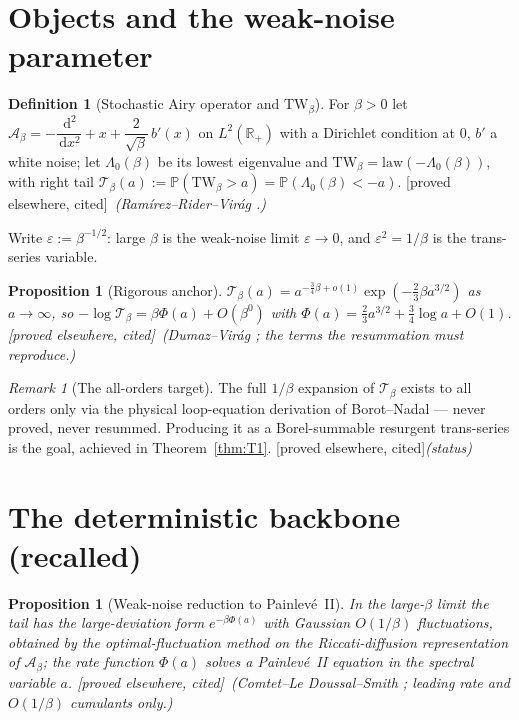 \documentclass[11pt,reqno]{amsart}
\theoremstyle{plain}
\newtheorem{proposition}[theorem]{Proposition}
\theoremstyle{definition}
\newtheorem{definition}[theorem]{Definition}
\theoremstyle{remark}
\newtheorem{remark}[theorem]{Remark}
\newcommand{\dd}{\,\mathrm{d}}
\newcommand{\R}{\mathbb{R}}
\newcommand{\Prob}{\mathbb{P}}
\newcommand{\SAO}{\mathcal{A}_\beta}
\newcommand{\TW}{\mathrm{TW}_\beta}
\newcommand{\eps}{\varepsilon}
\newcommand{\tagP}{{\footnotesize\textsf{[proved elsewhere, cited]}}}
\begin{document}
\maketitle

\section{Objects and the weak-noise parameter}

\begin{definition}[Stochastic Airy operator and $\TW$]\label{def:sao}
For $\beta>0$ let $\SAO=-\dfrac{\dd^2}{\dd x^2}+x+\dfrac{2}{\sqrt\beta}\,b'(x)$ on
$L^2(\R_+)$ with a Dirichlet condition at $0$, $b'$ a white noise; let $\Lambda_0(\beta)$ be its
lowest eigenvalue and $\TW=\mathrm{law}(-\Lambda_0(\beta))$, with right tail
$\mathcal T_\beta(a):=\Prob(\TW>a)=\Prob(\Lambda_0(\beta)<-a)$. \tagP\ \emph{(Ram\'irez--Rider--Vir\'ag
\cite{RRV}.)}
\end{definition}

Write $\eps:=\beta^{-1/2}$: large $\beta$ is the weak-noise limit $\eps\to0$, and $\eps^2=1/\beta$
is the trans-series variable.

\begin{proposition}[Rigorous anchor]\label{prop:anchor}
$\mathcal T_\beta(a)=a^{-\frac34\beta+o(1)}\exp(-\tfrac23\beta a^{3/2})$ as $a\to\infty$, so
$-\log\mathcal T_\beta=\beta\Phi(a)+O(\beta^0)$ with $\Phi(a)=\tfrac23a^{3/2}+\tfrac34\log a+O(1)$.
\tagP\ \emph{(Dumaz--Vir\'ag \cite{DV}; the terms the resummation must reproduce.)}
\end{proposition}

\begin{remark}[The all-orders target]\label{rem:target}
The full $1/\beta$ expansion of $\mathcal T_\beta$ exists to all orders only via the physical
loop-equation derivation of Borot--Nadal \cite{BorotNadal} --- never proved, never resummed.
Producing it as a Borel-summable resurgent trans-series is the goal, achieved in
Theorem~\ref{thm:T1}. \tagP\emph{(status)}
\end{remark}

\section{The deterministic backbone (recalled)}\label{sec:backbone}

\begin{proposition}[Weak-noise reduction to Painlev\'e~II]\label{prop:pii}
In the large-$\beta$ limit the tail has the large-deviation form $e^{-\beta\Phi(a)}$ with Gaussian
$O(1/\beta)$ fluctuations, obtained by the optimal-fluctuation method on the Riccati-diffusion
representation of $\SAO$; the rate function $\Phi(a)$ solves a Painlev\'e~II equation in the
spectral variable $a$. \tagP\ \emph{(Comtet--Le Doussal--Smith \cite{CLDS}; leading rate and
$O(1/\beta)$ cumulants only.)}
\end{proposition}
\end{document}
